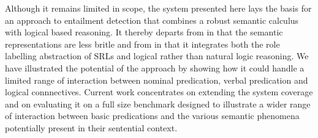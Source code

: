 \documentclass[twocolumn,10pt]{article}
\renewcommand\cite{\citep}
\begin{document}
Although it remains limited in scope, the system presented here lays
the basis for an approach to entailment detection that combines a
robust semantic calculus with logical based reasoning. It thereby
departs from \cite{Bos2006} in that the semantic representations are
less britle and from \cite{natlog} in that it integrates both the role
labelling abstraction of SRLs and logical rather than natural logic
reasoning. We have illustrated the potential of the approach by
showing how it could handle a limited range of interaction between
nominal predication, verbal predication and logical
connnectives. Current work concentrates on extending the system
coverage and on
evaluating it on a full size benchmark designed to
illustrate a wider range of interaction between basic predications and
the various semantic phenomena potentially present in their sentential
context.

\footnotesize{


}
\end{document}
